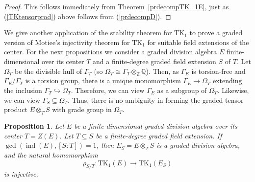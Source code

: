 \documentclass[11pt]{article}
\numberwithin{equation}{section}
\theoremstyle{plain}
\newtheorem{proposition}[theorem]{Proposition}
\theoremstyle{remark}
\newcommand{\opn}{\operatorname}
\newcommand{\TK}{\opn{TK_1}}
\newcommand{\zz}{\mathbb Z}
\newcommand{\qq}{\mathbb Q}
\begin{document}
 \begin{proof}
 This follows immediately from Theorem~\ref{prdecompTK_1E}, just as (\ref{TKtensorprod}) above follows 
 from (\ref{prdecompD}).
 \end{proof}
 
 We give another application of the stability theorem for $\TK$ to prove a graded version of Motiee's 
 injectivity theorem \cite[Th.~7]{motiee-2013} for $\TK$ for suitable field extensions of the center.  For the 
 next propositions we consider a graded division algebra $E$ finite-dimensional over its center $T$ and 
 a finite-degree graded field extension $S$ of $T$.  Let $\Omega_T$ be the divisible hull of $\Gamma_T$
 (so $\Omega_T \cong \Gamma_T \otimes_\zz \qq$).   Then, as $\Gamma_E$ is torsion-free and 
 $\Gamma_E/\Gamma_T$ is a torsion group, there is a unique monomorphism $\Gamma_E \to \Omega_T$
 extending the inclusion $\Gamma_T \hookrightarrow \Omega_T$.  Therefore, we can view $\Gamma_E$
 as a subgroup of $\Omega_T$.  Likewise,  we can view 
 $\Gamma_S \subseteq \Omega_T$.  Thus, there is no ambiguity in forming the graded tensor product 
 $E \otimes_T S$ with grade group in $\Omega_T$.
  
 
 \begin{proposition}
\label{prop:prime-to-index-injectivity}
Let $E$ be a finite-dimensional graded division algebra over its center $T=Z(E)$. Let $T\subseteq S$ be a 
finite-degree graded field extension. If $\gcd(\operatorname{ind}(E),[S:T])=1$, then $E_S=E\otimes_T S$ is a 
graded division algebra, and the natural homomorphism
$$
        \rho_{S/T}:\mathrm{TK}_1(E)\longrightarrow \mathrm{TK}_1(E_S)
$$
is injective.
\end{proposition}
\end{document}

